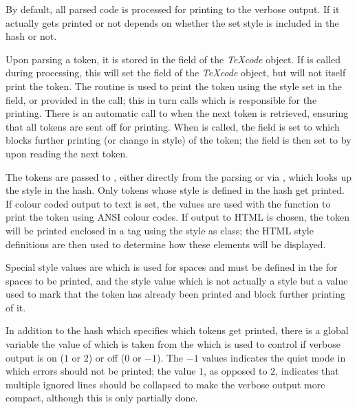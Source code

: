 \documentclass{article}
\newcommand\Obj[1]{\textsl{#1}}
\begin{document}
By default, all parsed code is processed for printing to the verbose output. If it actually gets printed or not depends on whether the set style is included in the  hash or not. 

Upon parsing a token, it is stored in the  field of the \Obj{TeXcode} object. If  is called during processing, this will set the  field of the \Obj{TeXcode} object, but will not itself print the token. The  routine is used to print the  token using the style set in the  field, or provided in the call; this in turn calls  which is responsible for the printing. There is an automatic call to  when the next token is retrieved, ensuring that all tokens are sent off for printing. When  is called, the  field is set to  which blocks further printing (or change in style) of the token; the  field is then set to  by  upon reading the next token.

The tokens are passed to , either directly from the parsing or via , which looks up the style in the  hash. Only tokens whose style is defined in the  hash get printed. If colour coded output to text is set, the values  are used with the  function to print the token using ANSI colour codes. If output to HTML is chosen, the token will be printed enclosed in a  tag using the style as class; the HTML style definitions are then used to determine how these elements will be displayed.

Special style values are  which is used for spaces and must be defined in the  for spaces to be printed, and the  style value which is not actually a style but a value used to mark that the token has already been printed and block further printing of it.

In addition to the  hash which specifies which tokens get printed, there is a global variable  the value of which is taken from the  which is used to control if verbose output is on ($1$ or $2$) or off ($0$ or $-1$). The $-1$ values indicates the quiet mode in which errors should not be printed; the value $1$, as opposed to $2$, indicates that multiple ignored lines should be collapsed to make the verbose output more compact, although this is only partially done.
\end{document}
